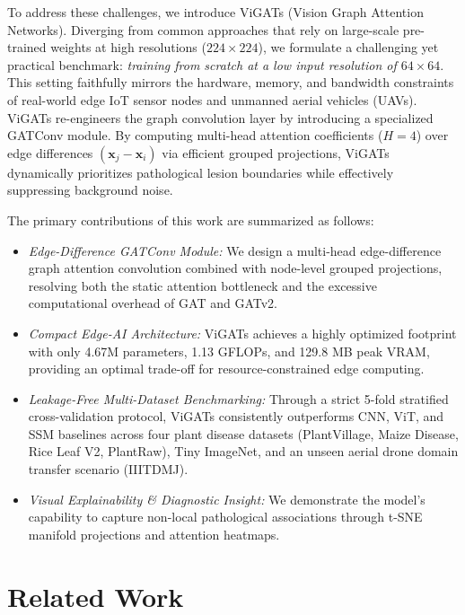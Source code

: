 \documentclass[]{interact}
\theoremstyle{plain}
\theoremstyle{definition}
\theoremstyle{remark}
\begin{document}
To address these challenges, we introduce ViGATs (Vision Graph Attention Networks). Diverging from common approaches that rely on large-scale pre-trained weights at high resolutions ($224 \times 224$), we formulate a challenging yet practical benchmark: \emph{training from scratch at a low input resolution of $64 \times 64$}. This setting faithfully mirrors the hardware, memory, and bandwidth constraints of real-world edge IoT sensor nodes and unmanned aerial vehicles (UAVs). ViGATs re-engineers the graph convolution layer by introducing a specialized GATConv module. By computing multi-head attention coefficients ($H=4$) over edge differences $(\mathbf{x}_j - \mathbf{x}_i)$ via efficient grouped projections, ViGATs dynamically prioritizes pathological lesion boundaries while effectively suppressing background noise.

The primary contributions of this work are summarized as follows:
\begin{itemize}
    \item \textit{Edge-Difference GATConv Module:} We design a multi-head edge-difference graph attention convolution combined with node-level grouped projections, resolving both the static attention bottleneck and the excessive computational overhead of GAT and GATv2.
    \item \textit{Compact Edge-AI Architecture:} ViGATs achieves a highly optimized footprint with only 4.67M parameters, 1.13 GFLOPs, and 129.8 MB peak VRAM, providing an optimal trade-off for resource-constrained edge computing.
    \item \textit{Leakage-Free Multi-Dataset Benchmarking:} Through a strict 5-fold stratified cross-validation protocol, ViGATs consistently outperforms CNN, ViT, and SSM baselines across four plant disease datasets (PlantVillage, Maize Disease, Rice Leaf V2, PlantRaw), Tiny ImageNet, and an unseen aerial drone domain transfer scenario (IIITDMJ).
    \item \textit{Visual Explainability \& Diagnostic Insight:} We demonstrate the model's capability to capture non-local pathological associations through t-SNE manifold projections and attention heatmaps.
\end{itemize}

\section{Related Work}
\label{sec:related-work}
\end{document}
